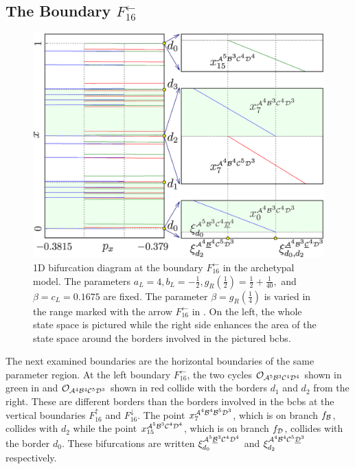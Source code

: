 \subsection{The Boundary $F_{16}^\leftarrow$}
\label{sec:arch.bif.L}

\begin{figure}
	\centering
	\includegraphics[width=.7 \textwidth]{../Figures/6/6.8/result.png}
	\caption[1D bifurcation diagram at the boundary $F_{16}^\leftarrow$ in the archetypal model]{
		1D bifurcation diagram at the boundary $F_{16}^\leftarrow$ in the archetypal model.
		The parameters $a_L = 4, b_L = -\frac{1}{2}, g_R\left(\frac{1}{2}\right) = \frac{1}{2} + \frac{1}{40},$ and $\beta = c_L = 0.1675$ are fixed.
		The parameter $\beta = g_R\left(\frac{1}{4}\right)$ is varied in the range marked with the arrow $F_{16}^\leftarrow$ in .
		On the left, the whole state space is pictured while the right side enhances the area of the state space around the borders involved in the pictured \glspl{bcb}.
	}
	\label{fig:arch.bif.F.left}
\end{figure}

The next examined boundaries are the horizontal boundaries of the same parameter region.
At the left boundary $F_{16}^\leftarrow$, the two cycles $\mathcal{O}_{\mathcal{A}^5\mathcal{B}^3\mathcal{C}^4\mathcal{D}^4}$ shown in green in  and $\mathcal{O}_{\mathcal{A}^4\mathcal{B}^4\mathcal{C}^5\mathcal{D}^3}$ shown in red collide with the borders $d_1$ and $d_2$ from the right.
These are different borders than the borders involved in the \glspl{bcb} at the vertical boundaries $F_{16}^\uparrow$ and $F_{16}^\downarrow$.
The point $x_{7}^{\mathcal{A}^4\mathcal{B}^4\mathcal{B}^5\mathcal{D}^3}$, which is on branch $f_{\mathcal{B}}$, collides with $d_2$ while the point $x_{15}^{\mathcal{A}^5\mathcal{B}^3\mathcal{C}^4\mathcal{D}^4}$, which is on branch $f_{\mathcal{D}}$, collides with the border $d_0$.
These bifurcations are written $\xi_{d_0}^{\mathcal{A}^5\underline{\mathcal{B}}^3\mathcal{C}^4\mathcal{D}^4}$ and $\xi_{d_2}^{\mathcal{A}^4\mathcal{B}^4\mathcal{C}^5\underline{\mathcal{D}}^3}$ respectively.

